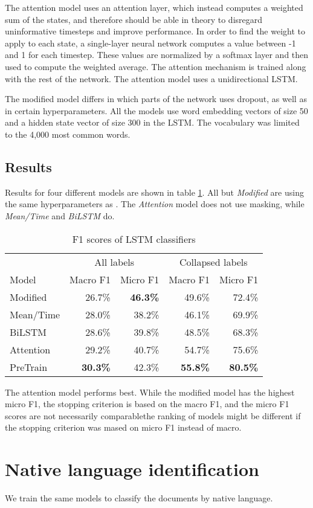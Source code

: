 The attention model uses an attention layer, which instead computes a
weighted sum of the states, and therefore should be able in theory to
disregard uninformative timesteps and improve performance. In order to find
the weight to apply to each state, a single-layer neural network computes a
value between -1 and 1 for each timestep. These values are normalized by a
softmax layer and then used to compute the weighted average. The attention
mechanism is trained along with the rest of the network. The attention model
uses a unidirectional \ac{LSTM}.

The modified model differs in which parts of the network uses dropout, as
well as in certain hyperparameters. All the models use word embedding vectors
of size 50 and a hidden state vector of size 300 in the \ac{LSTM}. The
vocabulary was limited to the 4,000 most common words.

\subsection{Results}

Results for four different models are shown in table \ref{lstm-results}. All
but \emph{Modified} are using the same hyperparameters as
\citeauthor{taghipour16}. The \emph{Attention} model does not use masking,
while \emph{Mean/Time} and \emph{BiLSTM} do.

\begin{table}
  \centering
  \begin{tabular}{|l|rr|rr|}
    \toprule
            & \multicolumn{2}{c|}{All labels} & \multicolumn{2}{c|}{Collapsed labels} \\
    Model     & Macro F1        & Micro F1        & Macro F1        & Micro F1        \\
    \midrule
    Modified  &         26.7\%  & \textbf{46.3\%} &         49.6\%  &         72.4\%  \\
    Mean/Time &         28.0\%  &         38.2\%  &         46.1\%  &         69.9\%  \\
    BiLSTM    &         28.6\%  &         39.8\%  &         48.5\%  &         68.3\%  \\
    Attention &         29.2\%  &         40.7\%  &         54.7\%  &         75.6\%  \\
    PreTrain  & \textbf{30.3\%} &         42.3\%  & \textbf{55.8\%} & \textbf{80.5\%} \\
    \bottomrule
  \end{tabular}
  \caption{F1 scores of LSTM classifiers}
  \label{lstm-results}
\end{table}

The attention model performs best. While the modified model has the highest
micro F1, the stopping criterion is based on the macro F1, and the micro
F1 scores are not necessarily comparable\textemdash the ranking of models might be
different if the stopping criterion was mased on micro F1 instead of macro.

\section{Native language identification}

We train the same models to classify the documents by native language.
